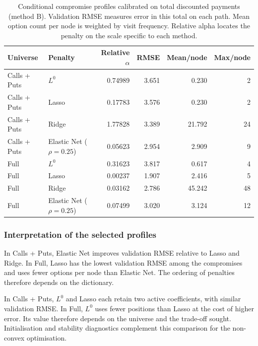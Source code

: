 \documentclass[12pt,a4paper]{article}
\newcommand{\1}{\mathbf{1}}
\begin{document}
\begin{table}[htbp]
\centering
\small
\begin{tabular}{llrrrr}
\toprule
Universe & Penalty & Relative $\alpha$ & RMSE & Mean/node & Max/node \\
\midrule
Calls + Puts & $L^0$ & 0.74989 & 3.651 & 0.230 & 2 \\
Calls + Puts & Lasso & 0.17783 & 3.576 & 0.230 & 2 \\
Calls + Puts & Ridge & 1.77828 & 3.389 & 21.792 & 24 \\
Calls + Puts & Elastic Net ($\rho=0.25$) & 0.05623 & 2.954 & 2.909 & 9 \\
Full & $L^0$ & 0.31623 & 3.817 & 0.617 & 4 \\
Full & Lasso & 0.00237 & 1.907 & 2.416 & 5 \\
Full & Ridge & 0.03162 & 2.786 & 45.242 & 48 \\
Full & Elastic Net ($\rho=0.25$) & 0.07499 & 3.020 & 3.124 & 12 \\
\bottomrule
\end{tabular}
\caption{Conditional compromise profiles calibrated on total discounted payments (method B). Validation RMSE measures error in this total on each path. Mean option count per node is weighted by visit frequency. Relative alpha locates the penalty on the scale specific to each method.}
\label{tab:selected}
\end{table}

\subsubsection*{Interpretation of the selected profiles}

In Calls + Puts, Elastic Net improves validation RMSE relative to Lasso and Ridge. In Full, Lasso has the lowest validation RMSE among the compromises and uses fewer options per node than Elastic Net. The ordering of penalties therefore depends on the dictionary.

In Calls + Puts, $L^0$ and Lasso each retain two active coefficients, with similar validation RMSE. In Full, $L^0$ uses fewer positions than Lasso at the cost of higher error. Its value therefore depends on the universe and the trade-off sought. Initialisation and stability diagnostics complement this comparison for the non-convex optimisation.
\end{document}
